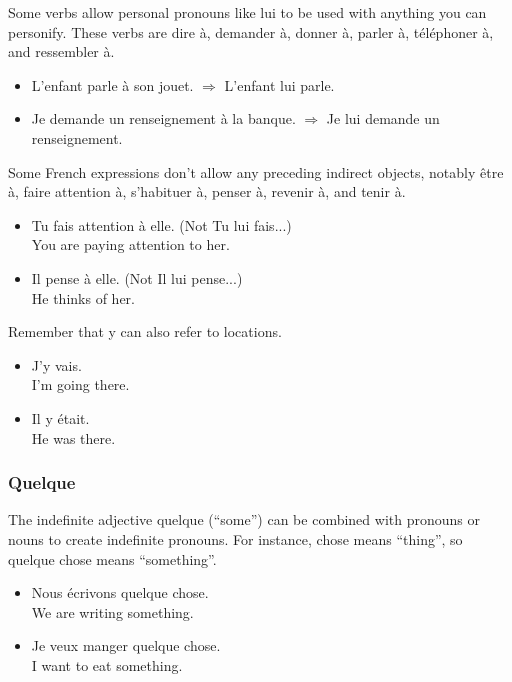 Some verbs allow personal pronouns like lui to be used with anything you can personify. These verbs are dire {\`a}, demander {\`a}, donner {\`a}, parler {\`a}, t{\'e}l{\'e}phoner {\`a}, and ressembler {\`a}.

\begin{itemize}
  \item  L'enfant parle {\`a} son jouet. $\Rightarrow$ L'enfant lui parle.
	\item  Je demande un renseignement {\`a} la banque. $\Rightarrow$ Je lui demande un renseignement.
\end{itemize}

Some French expressions don't allow any preceding indirect objects, notably {\^e}tre {\`a}, faire attention {\`a}, s'habituer {\`a}, penser {\`a}, revenir {\`a}, and tenir {\`a}.

\begin{itemize}
  \item  Tu fais attention {\`a} elle. (Not Tu lui fais...) \\ You are paying attention to her.
	\item  Il pense {\`a} elle. (Not Il lui pense...) \\ He thinks of her.
\end{itemize}

Remember that y can also refer to locations.

\begin{itemize}
  \item  J'y vais. \\ I'm going there.
	\item  Il y {\'e}tait. \\ He was there.
\end{itemize}

\subsubsection{Quelque}

The indefinite adjective quelque (``some'') can be combined with pronouns or nouns to create indefinite pronouns. For instance, chose means ``thing'', so quelque chose means ``something''.

\begin{itemize}
  \item  Nous {\'e}crivons quelque chose. \\ We are writing something.
	\item  Je veux manger quelque chose. \\ I want to eat something.
\end{itemize}

